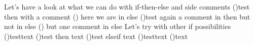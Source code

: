 Let's have a look at what we can do
with if-then-else and side comments\;
\eIf(){test}{
  then with a comment\;
}()
{
  here we are in else\;
}
\eIf(){test}{
  again a comment in then\;
}{
  but not in else\;
}
()
{
  but one comment in else\;
}
Let's try with other if possibilities\;
\lIf(){test}{text}
\uIf(){test}{
  then text\;
}
\uElseIf(){test}{
  elseif text\;
}
\lElseIf(){test}{text}
\lElse(){text}
